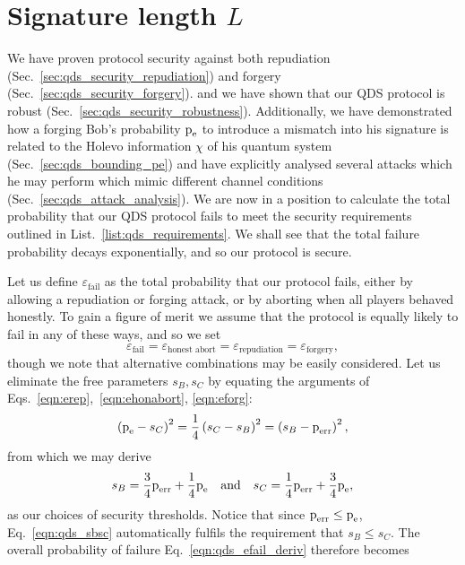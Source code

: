 \clearpage
\section{Signature length $L$}\label{sec:qds_siglength}
We have proven protocol security against both repudiation (Sec.~\ref{sec:qds_security_repudiation}) and forgery (Sec.~\ref{sec:qds_security_forgery}). and we have shown that our QDS protocol is robust (Sec.~\ref{sec:qds_security_robustness}). Additionally, we have demonstrated how a forging Bob's probability $\text{p}_{\text{e}}$ to introduce a mismatch into his signature is related to the Holevo information $\chi$ of his quantum system (Sec.~\ref{sec:qds_bounding_pe}) and have explicitly analysed several attacks which he may perform which mimic different channel conditions (Sec.~\ref{sec:qds_attack_analysis}). We are now in a position to calculate the total probability that our QDS protocol fails to meet the security requirements outlined in List.~\ref{list:qds_requirements}. We shall see that the total failure probability decays exponentially, and so our protocol is secure.

Let us define $\varepsilon_{\text{fail}}$ as the total probability that our protocol fails, either by allowing a repudiation or forging attack, or by aborting when all players behaved honestly. To gain a figure of merit we assume that the protocol is equally likely to fail in any of these ways, and so we set
\begin{equation}\label{eqn:qds_efail_deriv}
\varepsilon_{\text{fail}} = \varepsilon_{\text{honest abort}} = \varepsilon_{\text{repudiation}} = \varepsilon_{\text{forgery}},
\end{equation}
though we note that alternative combinations may be easily considered. Let us eliminate the free parameters $s_B, s_C$ by equating the arguments of Eqs.~\ref{eqn:erep},~\ref{eqn:ehonabort}, \ref{eqn:eforg}:
\begin{equation}
\left(\text{p}_{\text{e}} - s_C\right)^2  = \frac{1}{4}\left(s_C - s_B\right)^2 = \left(s_B - \text{p}_{\text{err}}\right)^2,
\end{equation}
from which we may derive
\begin{equation}\label{eqn:qds_sbsc}
s_B = \frac{3}{4} \perr + \frac{1}{4}\pe \qq{and} s_C = \frac{1}{4}\perr + \frac{3}{4}\pe,
\end{equation}
as our choices of security thresholds. Notice that since $\text{p}_{\text{err}} \le \text{p}_{\text{e}}$, Eq.~\ref{eqn:qds_sbsc} automatically fulfils the requirement that $s_B \le s_C$. The overall probability of failure Eq.~\ref{eqn:qds_efail_deriv} therefore becomes

